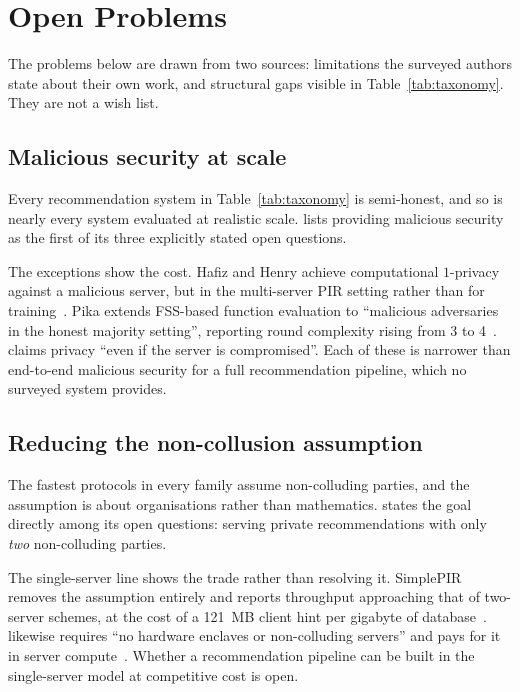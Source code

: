 \section{Open Problems}
\label{sec:open}

The problems below are drawn from two sources: limitations the surveyed authors state about their
own work, and structural gaps visible in Table~\ref{tab:taxonomy}. They are not a wish list.

\subsection{Malicious security at scale}
\label{sec:open:malicious}

Every recommendation system in Table~\ref{tab:taxonomy} is semi-honest, and so is nearly every
system evaluated at realistic scale. \nudge{} lists providing malicious security as the first of
its three explicitly stated open questions.

The exceptions show the cost. Hafiz and Henry achieve computational $1$-privacy against a
malicious server, but in the multi-server PIR setting rather than for
training~\cite{hafiz2019}. Pika extends FSS-based function evaluation to ``malicious adversaries in
the honest majority setting'', reporting round complexity rising from 3 to 4~\cite{pika2022}.
\compass{} claims privacy ``even if the server is compromised''. Each of these is narrower than
end-to-end malicious security for a full recommendation pipeline, which no surveyed system
provides.

\subsection{Reducing the non-collusion assumption}
\label{sec:open:collusion}

The fastest protocols in every family assume non-colluding parties, and the assumption is about
organisations rather than mathematics. \nudgeplain{} states the goal directly among its open
questions: serving private recommendations with only \emph{two} non-colluding parties.

The single-server line shows the trade rather than resolving it. SimplePIR removes the assumption
entirely and reports throughput approaching that of two-server schemes, at the cost of a 121~MB
client hint per gigabyte of database~\cite{simplepir2023}. \tiptoeplain{} likewise requires
``no hardware enclaves or non-colluding servers'' and pays for it in server
compute~\cite{tiptoe2023}. Whether a recommendation pipeline can be built in the single-server
model at competitive cost is open.

